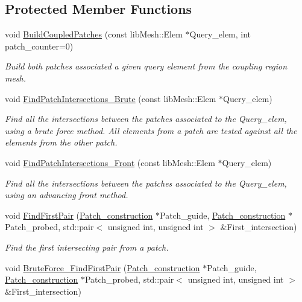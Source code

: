 \subsection*{Protected Member Functions}
\begin{DoxyCompactItemize}
\item 
void \hyperlink{classcarl_1_1_intersection___search_a00e012de151310737c771ee7b15c9b2c}{Build\+Coupled\+Patches} (const lib\+Mesh\+::\+Elem $\ast$Query\+\_\+elem, int patch\+\_\+counter=0)
\begin{DoxyCompactList}\small\item\em Build both patches associated a given query element from the coupling region mesh. \end{DoxyCompactList}\item 
void \hyperlink{classcarl_1_1_intersection___search_ad91e556edabe62c1b0b5d30e3fc3bcef}{Find\+Patch\+Intersections\+\_\+\+Brute} (const lib\+Mesh\+::\+Elem $\ast$Query\+\_\+elem)
\begin{DoxyCompactList}\small\item\em Find all the intersections between the patches associated to the Query\+\_\+elem, using a brute force method. All elements from a patch are tested against all the elements from the other patch. \end{DoxyCompactList}\item 
void \hyperlink{classcarl_1_1_intersection___search_ad3ea665115367f2a90183e581d9d2d70}{Find\+Patch\+Intersections\+\_\+\+Front} (const lib\+Mesh\+::\+Elem $\ast$Query\+\_\+elem)
\begin{DoxyCompactList}\small\item\em Find all the intersections between the patches associated to the Query\+\_\+elem, using an advancing front method. \end{DoxyCompactList}\item 
void \hyperlink{classcarl_1_1_intersection___search_a356354c6a37455be8d0626ae9b874614}{Find\+First\+Pair} (\hyperlink{classcarl_1_1_patch__construction}{Patch\+\_\+construction} $\ast$Patch\+\_\+guide, \hyperlink{classcarl_1_1_patch__construction}{Patch\+\_\+construction} $\ast$Patch\+\_\+probed, std\+::pair$<$ unsigned int, unsigned int $>$ \&First\+\_\+intersection)
\begin{DoxyCompactList}\small\item\em Find the first intersecting pair from a patch. \end{DoxyCompactList}\item 
void \hyperlink{classcarl_1_1_intersection___search_a7b67f7bd29530492dbd0b0eeca67645b}{Brute\+Force\+\_\+\+Find\+First\+Pair} (\hyperlink{classcarl_1_1_patch__construction}{Patch\+\_\+construction} $\ast$Patch\+\_\+guide, \hyperlink{classcarl_1_1_patch__construction}{Patch\+\_\+construction} $\ast$Patch\+\_\+probed, std\+::pair$<$ unsigned int, unsigned int $>$ \&First\+\_\+intersection)

\end{DoxyCompactItemize}
